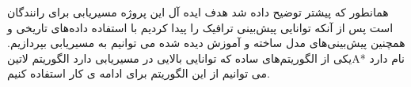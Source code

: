 همانطور که پیشتر توضیح داده شد هدف ایده آل این پروژه مسیریابی برای رانندگان است پس از آنکه توانایی پیش‌بینی ترافیک را پیدا کردیم با استفاده داده‌های تاریخی  و همچنین پیش‌بینی‌های مدل ساخته و آموزش دیده شده می توانیم به مسیریابی بپردازیم. یکی از الگوریتم‌های ساده که توانایی بالایی در مسیریابی دارد الگوریتم ‌لاتین{‌A*} نام دارد می توانیم از این الگوریتم برای ادامه ی کار استفاده کنیم.
